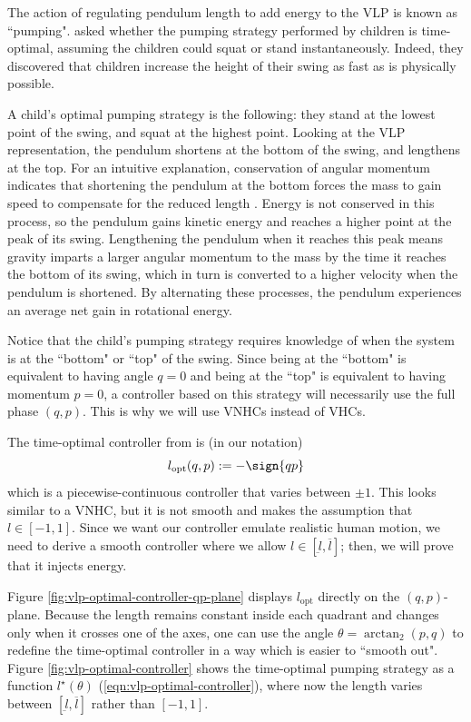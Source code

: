 The action of regulating pendulum length to add energy to the VLP is known as
``pumping". \citet{pumping_swing_standing_squatting} asked whether
the pumping strategy performed by children is time-optimal, assuming the
children could squat or stand instantaneously. 
Indeed, they discovered that children increase the height of their swing as fast
as is physically possible.

A child's optimal pumping strategy is the following: 
they stand at the lowest point of the swing, and squat at the highest point.
Looking at the VLP representation, the pendulum shortens at the bottom of the
swing, and lengthens at the top. 
For an intuitive explanation, conservation of angular momentum indicates that
shortening the pendulum at the bottom forces the mass to gain speed to
compensate for the reduced length \cite{how_to_pump_a_swing}.
Energy is not conserved in this process, so the pendulum gains kinetic energy
and reaches a higher point at the peak of its swing.
Lengthening the pendulum when it reaches this peak means gravity
imparts a larger angular momentum to the mass by the time it reaches the bottom
of its swing, which in turn is converted to a higher velocity when the
pendulum is shortened.
By alternating these processes, the pendulum experiences an average net gain in
rotational energy.

Notice that the child's pumping strategy requires knowledge of
when the system is at the ``bottom" or ``top" of the swing. 
Since being at the ``bottom" is equivalent to having angle \(q = 0\) and being
at the ``top" is equivalent to having momentum \(p = 0\), a controller based on
this strategy will necessarily use the full phase \((q,p)\). 
This is why we will use VNHCs instead of VHCs.

The time-optimal controller from \cite{pumping_swing_standing_squatting} is (in
our notation)
\[
   l_\text{opt}(q,p) := -\sign{qp}
\]
which is a piecewise-continuous controller that varies between \(\pm 1\). 
This looks similar to a VNHC, but it is not smooth and makes the assumption that 
\(l \in [-1,1]\). 
Since we want our controller emulate realistic human motion, we need to derive a
smooth controller where we allow \(l \in [\underbar{l},\overbar{l}]\); then, we
will prove that it injects energy.

Figure \ref{fig:vlp-optimal-controller-qp-plane} displays \(l_\text{opt}\) 
directly on the \((q,p)\)-plane.
Because the length remains constant inside each quadrant and changes only when it
crosses one of the axes, one can use the angle \(\theta = \arctan_2(p,q)\) to
redefine the time-optimal controller in a way which is easier to ``smooth out".
Figure \ref{fig:vlp-optimal-controller} shows the time-optimal pumping strategy
as a function \(l^\star(\theta)\) (\ref{eqn:vlp-optimal-controller}), where now
the length varies between \([\underbar{l},\overbar{l}]\) rather than 
\([-1,1]\). 

